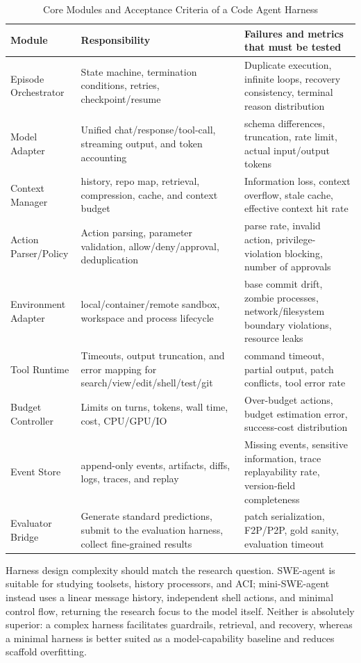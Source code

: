 \documentclass[10pt,a4paper,UTF8,fontset=none]{ctexart}
\begin{document}
\begin{table}[htbp]
\centering
\caption{Core Modules and Acceptance Criteria of a Code Agent Harness}
\label{tab:harness}
\small
\begin{tabularx}{\textwidth}{p{2.8cm}YY}
\toprule
Module & Responsibility & Failures and metrics that must be tested \\
\midrule
Episode Orchestrator & State machine, termination conditions, retries, checkpoint/resume & Duplicate execution, infinite loops, recovery consistency, terminal reason distribution \\
Model Adapter & Unified chat/response/tool-call, streaming output, and token accounting & schema differences, truncation, rate limit, actual input/output tokens \\
Context Manager & history, repo map, retrieval, compression, cache, and context budget & Information loss, context overflow, stale cache, effective context hit rate \\
Action Parser/Policy & Action parsing, parameter validation, allow/deny/approval, deduplication & parse rate, invalid action, privilege-violation blocking, number of approvals \\
Environment Adapter & local/container/remote sandbox, workspace and process lifecycle & base commit drift, zombie processes, network/filesystem boundary violations, resource leaks \\
Tool Runtime & Timeouts, output truncation, and error mapping for search/view/edit/shell/test/git & command timeout, partial output, patch conflicts, tool error rate \\
Budget Controller & Limits on turns, tokens, wall time, cost, CPU/GPU/IO & Over-budget actions, budget estimation error, success-cost distribution \\
Event Store & append-only events, artifacts, diffs, logs, traces, and replay & Missing events, sensitive information, trace replayability rate, version-field completeness \\
Evaluator Bridge & Generate standard predictions, submit to the evaluation harness, collect fine-grained results & patch serialization, F2P/P2P, gold sanity, evaluation timeout \\
\bottomrule
\end{tabularx}
\end{table}

Harness design complexity should match the research question. SWE-agent is suitable for studying toolsets, history processors, and ACI; mini-SWE-agent instead uses a linear message history, independent shell actions, and minimal control flow, returning the research focus to the model itself\cite{minisweagent2026}. Neither is absolutely superior: a complex harness facilitates guardrails, retrieval, and recovery, whereas a minimal harness is better suited as a model-capability baseline and reduces scaffold overfitting.
\end{document}
